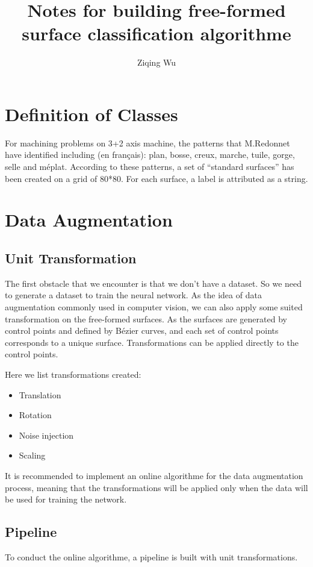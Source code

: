 \documentclass[a4paper,10pt]{article}
\title{Notes for building free-formed surface classification algorithme}
\author{Ziqing Wu}
\begin{document}
\maketitle

% 

\section{Definition of Classes}

For machining problems on 3+2 axis machine, the patterns that M.Redonnet have identified including (en français): plan, bosse, creux, marche, tuile, gorge, selle and méplat. According to these patterns, a set of ``standard surfaces'' has been created on a grid of 80*80. For each surface, a label is attributed as a string. 

\section{Data Augmentation}

\subsection{Unit Transformation}
The first obstacle that we encounter is that we don't have a dataset. So we need to generate a dataset to train the neural network. As the idea of data augmentation commonly used in computer vision, we can also apply some suited transformation on the free-formed surfaces. As the surfaces are generated by control points and defined by Bézier curves, and each set of control points corresponds to a unique surface. Transformations can be applied directly to the control points.

Here we list transformations created:
\begin{itemize}
 \item Translation
 \item Rotation
 \item Noise injection
 \item Scaling
\end{itemize}

It is recommended to implement an online algorithme for the data augmentation process, meaning that the transformations will be applied only when the data will be used for training the network.

\subsection{Pipeline}
To conduct the online algorithme, a pipeline is built with unit transformations. 
\end{document}
